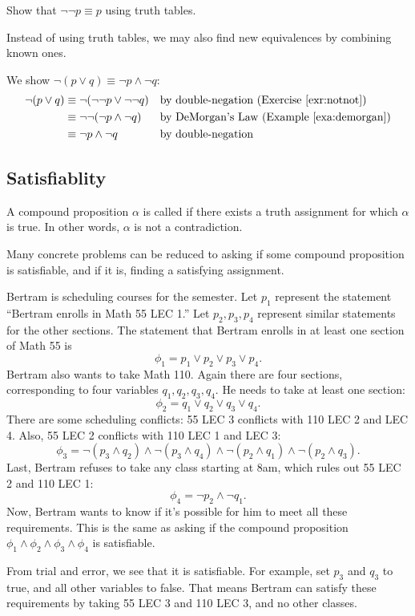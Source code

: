 \begin{exercise} \label{exr:notnot}%
  Show that $\lnot \lnot p \equiv p$ using truth tables.
\end{exercise}

Instead of using truth tables, we may also find new equivalences by
combining known ones.

\begin{example}
  We show $\lnot (p \lor q) \equiv \lnot p \land \lnot q$:
  \begin{align*}
    \lnot (p \lor q)
    &\equiv \lnot (\lnot \lnot p \lor \lnot \lnot q)
    & &\text{by double-negation (Exercise~\ref{exr:notnot})} \\
    &\equiv \lnot \lnot (\lnot p \land \lnot q)
    & &\text{by DeMorgan's Law (Example~\ref{exa:demorgan})} \\
    &\equiv \lnot p \land \lnot q & & \text{by double-negation}
  \end{align*}
\end{example}

\subsection{Satisfiablity}
\begin{defn}
  A compound proposition $\alpha$ is called  if there
  exists a truth assignment for which $\alpha$ is true.  In other words,
  $\alpha$ is not a contradiction.
\end{defn}

Many concrete problems can be reduced to asking if some compound
proposition is satisfiable, and if it is, finding a satisfying assignment.

\begin{example}
  Bertram is scheduling courses for the semester.  Let $p_1$ represent the
  statement ``Bertram enrolls in Math 55 LEC 1.''  Let $p_2,p_3,p_4$
  represent similar statements for the other sections.  The statement that
  Bertram enrolls in at least one section of Math 55 is
  \[
    \phi_1 = p_1 \lor p_2 \lor p_3 \lor p_4.
  \]
  Bertram also wants to take Math 110.  Again there are four sections,
  corresponding to four variables $q_1, q_2, q_3, q_4$.  He needs to take
  at least one section:
  \[
    \phi_2 = q_1 \lor q_2 \lor q_3 \lor q_4.
  \]
  There are some scheduling conflicts: 55 LEC 3 conflicts with 110 LEC 2
  and LEC 4.  Also, 55 LEC 2 conflicts with 110 LEC 1 and LEC 3:
  \[
    \phi_3 = \lnot (p_3 \land q_2) \land \lnot (p_3 \land q_4) \land \lnot (p_2
    \land q_1) \land \lnot (p_2 \land q_3).
  \]
  Last, Bertram refuses to take any class starting at 8am, which rules out
  55 LEC 2 and 110 LEC 1:
  \[
    \phi_4 = \lnot p_2 \land \lnot q_1.
  \]
  Now, Bertram wants to know if it's possible for him to meet all these
  requirements.  This is the same as asking if the compound proposition
  $\phi_1 \land \phi_2 \land \phi_3 \land \phi_4$ is satisfiable.

  From trial and error, we see that it is satisfiable.  For example, set
  $p_3$ and $q_3$ to true, and all other variables to false.  That means
  Bertram can satisfy these requirements by taking 55 LEC 3 and 110 LEC 3,
  and no other classes.
\end{example}
